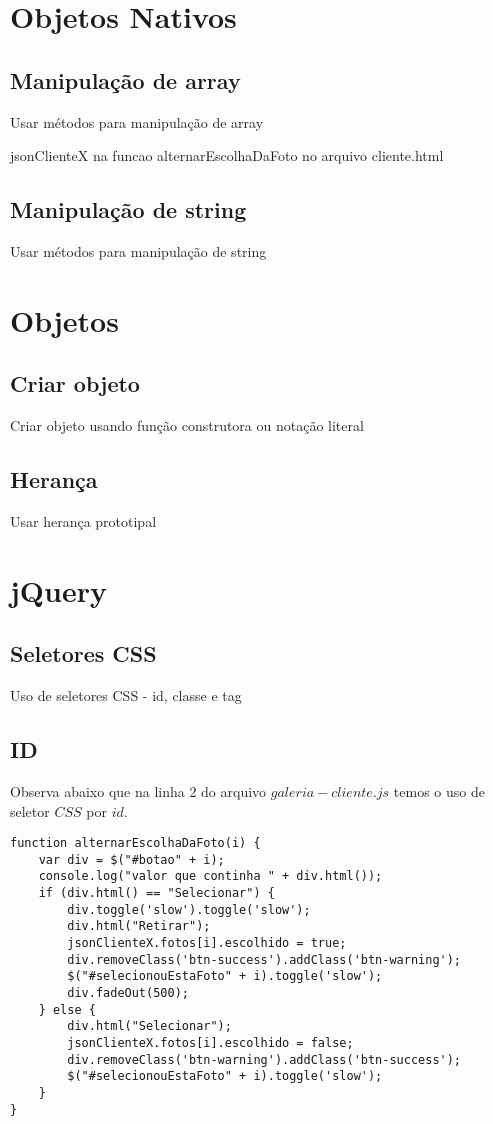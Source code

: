 \section{Objetos Nativos}
\subsection{Manipulação de array}
Usar métodos para manipulação de array

jsonClienteX na funcao alternarEscolhaDaFoto no arquivo cliente.html



\subsection{Manipulação de string}


Usar métodos para manipulação de string


\section{Objetos}
\subsection{Criar objeto}
Criar objeto usando função construtora ou notação literal


\subsection{Herança}
Usar herança prototipal


\section{jQuery}
\subsection{Seletores CSS}
Uso de seletores CSS - id, classe e tag
\subsection{ID}
	Observa abaixo que na linha 2 do arquivo $galeria-cliente.js$ temos o uso de seletor $CSS$ por $id$.
	
\begin{lstlisting}
function alternarEscolhaDaFoto(i) {
    var div = $("#botao" + i);
    console.log("valor que continha " + div.html());
    if (div.html() == "Selecionar") {
        div.toggle('slow').toggle('slow');
        div.html("Retirar");
        jsonClienteX.fotos[i].escolhido = true;
        div.removeClass('btn-success').addClass('btn-warning');
        $("#selecionouEstaFoto" + i).toggle('slow');
        div.fadeOut(500);
    } else {
        div.html("Selecionar");
        jsonClienteX.fotos[i].escolhido = false;
        div.removeClass('btn-warning').addClass('btn-success');
        $("#selecionouEstaFoto" + i).toggle('slow');
    }
}
\end{lstlisting}
